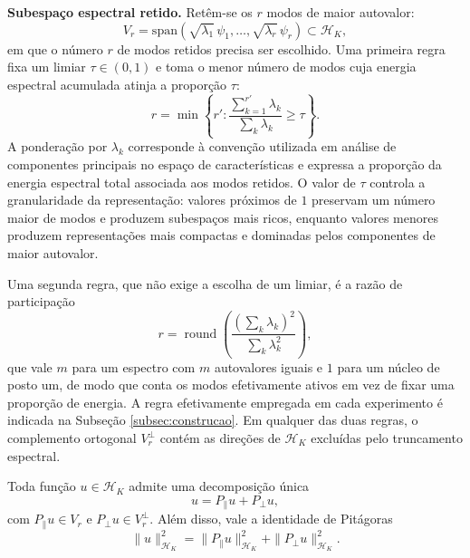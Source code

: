 \textbf{Subespaço espectral retido.} Retêm-se os $r$ modos de maior autovalor:
\begin{equation}\label{eq:V_r}
    V_r
    =
    \mathrm{span}
    \left(
        \sqrt{\lambda_1}\,\psi_1,
        \dots,
        \sqrt{\lambda_r}\,\psi_r
    \right)
    \subset \mathcal{H}_K,
\end{equation}
em que o número $r$ de modos retidos precisa ser escolhido. Uma primeira regra fixa um limiar $\tau \in (0,1)$ e toma o menor número de modos cuja energia espectral acumulada atinja a proporção $\tau$:
\begin{equation}\label{eq:r_threshold}
    r
    =
    \min
    \left\{
        r' :
        \frac{
            \sum_{k=1}^{r'} \lambda_k
        }{
            \sum_k \lambda_k
        }
        \geq \tau
    \right\}.
\end{equation}
A ponderação por $\lambda_k$ corresponde à convenção utilizada em análise de componentes principais no espaço de características e expressa a proporção da energia espectral total associada aos modos retidos. O valor de $\tau$ controla a granularidade da representação: valores próximos de $1$ preservam um número maior de modos e produzem subespaços mais ricos, enquanto valores menores produzem representações mais compactas e dominadas pelos componentes de maior autovalor.

Uma segunda regra, que não exige a escolha de um limiar, é a razão de participação
\begin{equation}\label{eq:r_participation}
    r
    =
    \operatorname{round}
    \left(
        \frac{
            \left(\sum_k \lambda_k\right)^2
        }{
            \sum_k \lambda_k^2
        }
    \right),
\end{equation}
que vale $m$ para um espectro com $m$ autovalores iguais e $1$ para um núcleo de posto um, de modo que conta os modos efetivamente ativos em vez de fixar uma proporção de energia. A regra efetivamente empregada em cada experimento é indicada na Subseção \ref{subsec:construcao}. Em qualquer das duas regras, o complemento ortogonal $V_r^\perp$ contém as direções de $\mathcal{H}_K$ excluídas pelo truncamento espectral.
 
\begin{proposition}\label{prop:ortho_decomp}
Toda função $u \in \mathcal{H}_K$ admite uma decomposição única
\begin{equation}\label{eq:ortho_decomp}
    u
    =
    P_\parallel u
    +
    P_\perp u,
\end{equation}
com $P_\parallel u \in V_r$ e $P_\perp u \in V_r^\perp$. Além disso, vale a identidade de Pitágoras
\begin{equation}\label{eq:pythagoras}
    \|u\|_{\mathcal{H}_K}^2
    =
    \|P_\parallel u\|_{\mathcal{H}_K}^2
    +
    \|P_\perp u\|_{\mathcal{H}_K}^2.
\end{equation}
\end{proposition}
 
